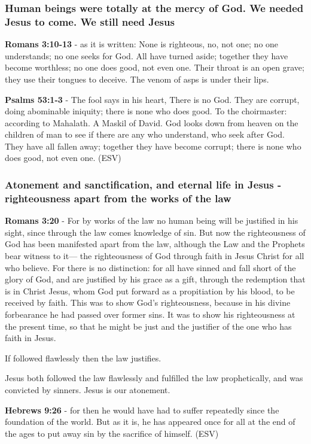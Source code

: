 \documentclass[11pt]{article}
\begin{document}
\subsubsection{Human beings were totally at the mercy of God. We needed Jesus to come. We still need Jesus}
\label{sec:org4f7c4d0}
\textbf{Romans 3:10-13} - as it is written: None is righteous, no, not one; no one understands; no one seeks for God.  All have turned aside; together they have become worthless; no one does good, not even one.  Their throat is an open grave; they use their tongues to deceive. The venom of asps is under their lips.

\textbf{Psalms 53:1-3} -  The fool says in his heart, There is no God.  They are corrupt, doing abominable iniquity; there is none who does good.  To the choirmaster: according to Mahalath.  A Maskil of David.  God looks down from heaven on the children of man to see if there are any who understand, who seek after God.  They have all fallen away; together they have become corrupt; there is none who does good, not even one.  (ESV)

\subsubsection{Atonement and sanctification, and eternal life in Jesus - righteousness apart from the works of the law}
\label{sec:orgbab0a10}
\textbf{Romans 3:20} - For by works of the law no human being will be justified in his sight, since through the law comes knowledge of sin.  But now the righteousness of God has been manifested apart from the law, although the Law and the Prophets bear witness to it— the righteousness of God through faith in Jesus Christ for all who believe. For there is no distinction: for all have sinned and fall short of the glory of God, and are justified by his grace as a gift, through the redemption that is in Christ Jesus, whom God put forward as a propitiation by his blood, to be received by faith. This was to show God's righteousness, because in his divine forbearance he had passed over former sins.  It was to show his righteousness at the present time, so that he might be just and the justifier of the one who has faith in Jesus.

If followed flawlessly then the law justifies.

Jesus both followed the law flawlessly and fulfilled the law prophetically, and was convicted by sinners. Jesus is our atonement.

\textbf{Hebrews 9:26} - for then he would have had to suffer repeatedly since the foundation of the world.  But as it is, he has appeared once for all at the end of the ages to put away sin by the sacrifice of himself.  (ESV)
\end{document}
